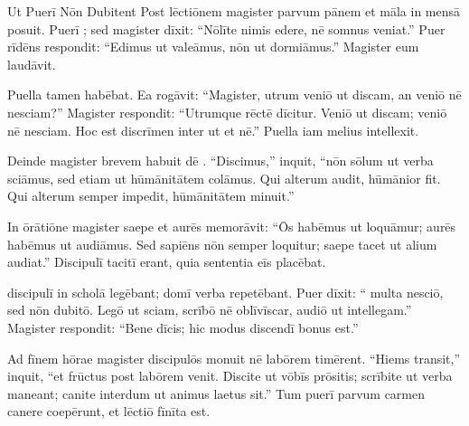 \documentclass[12pt]{nextbook}
\begin{document}
\begin{readersection}{Ut Puerī Nōn Dubitent}
Post lēctiōnem magister parvum pānem et māla in mensā posuit. Puerī ; sed magister dīxit: “Nōlīte nimis edere, nē somnus veniat.” Puer rīdēns respondit: “Edimus ut valeāmus, nōn ut dormiāmus.” Magister eum laudāvit.

Puella tamen  habēbat. Ea rogāvit: “Magister, utrum veniō ut discam, an veniō nē nesciam?” Magister respondit: “Utrumque rēctē dīcitur. Veniō ut discam; veniō nē nesciam. Hoc est discrīmen inter ut et nē.” Puella iam melius intellexit.

Deinde magister brevem  habuit dē . “Discimus,” inquit, “nōn sōlum ut verba sciāmus, sed etiam ut hūmānitātem colāmus. Qui alterum audit, hūmānior fit. Qui alterum semper impedit, hūmānitātem minuit.”

In ōrātiōne magister saepe  et aurēs memorāvit: “Ōs habēmus ut loquāmur; aurēs habēmus ut audiāmus. Sed sapiēns nōn semper loquitur; saepe tacet ut alium audiat.” Discipulī tacitī erant, quia sententia eīs placēbat.

 discipulī in scholā legēbant;  domī verba repetēbant. Puer dīxit: “ multa nesciō, sed nōn dubitō. Legō ut sciam, scrībō nē oblīvīscar, audiō ut intellegam.” Magister respondit: “Bene dīcis; hic modus discendī bonus est.”

Ad fīnem hōrae magister discipulōs monuit nē labōrem timērent. “Hiems transit,” inquit, “et frūctus post labōrem venit. Discite ut vōbīs prōsitis; scrībite ut verba maneant; canite interdum ut animus laetus sit.” Tum puerī parvum carmen canere coepērunt, et lēctiō fīnīta est.

\end{readersection}
\end{document}
